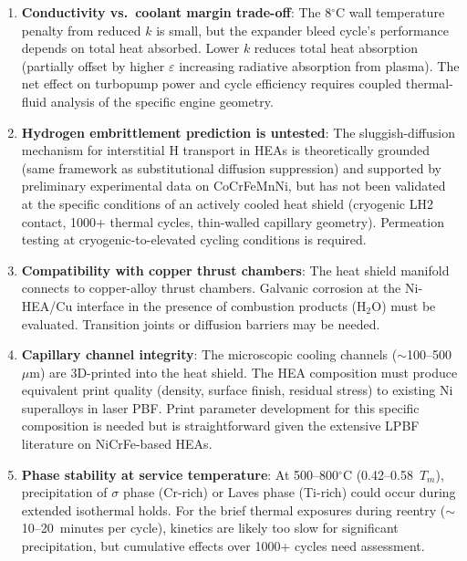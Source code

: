 \documentclass[12pt,letterpaper]{article}
\theoremstyle{definition}
\begin{document}
\begin{enumerate}
  \item \textbf{Conductivity vs.\ coolant margin trade-off}: The 8$^\circ$C wall temperature penalty from reduced $k$ is small, but the expander bleed cycle's performance depends on total heat absorbed.  Lower $k$ reduces total heat absorption (partially offset by higher $\varepsilon$ increasing radiative absorption from plasma).  The net effect on turbopump power and cycle efficiency requires coupled thermal-fluid analysis of the specific engine geometry.

  \item \textbf{Hydrogen embrittlement prediction is untested}: The sluggish-diffusion mechanism for interstitial H transport in HEAs is theoretically grounded (same framework as substitutional diffusion suppression) and supported by preliminary experimental data on CoCrFeMnNi, but has not been validated at the specific conditions of an actively cooled heat shield (cryogenic LH2 contact, 1000+ thermal cycles, thin-walled capillary geometry).  Permeation testing at cryogenic-to-elevated cycling conditions is required.

  \item \textbf{Compatibility with copper thrust chambers}: The heat shield manifold connects to copper-alloy thrust chambers.  Galvanic corrosion at the Ni-HEA/Cu interface in the presence of combustion products (H$_2$O) must be evaluated.  Transition joints or diffusion barriers may be needed.

  \item \textbf{Capillary channel integrity}: The microscopic cooling channels ($\sim$100--500~$\mu$m) are 3D-printed into the heat shield.  The HEA composition must produce equivalent print quality (density, surface finish, residual stress) to existing Ni superalloys in laser PBF\@.  Print parameter development for this specific composition is needed but is straightforward given the extensive LPBF literature on NiCrFe-based HEAs.

  \item \textbf{Phase stability at service temperature}: At 500--800$^\circ$C (0.42--0.58~$T_m$), precipitation of $\sigma$ phase (Cr-rich) or Laves phase (Ti-rich) could occur during extended isothermal holds.  For the brief thermal exposures during reentry ($\sim$10--20~minutes per cycle), kinetics are likely too slow for significant precipitation, but cumulative effects over 1000+ cycles need assessment.
\end{enumerate}
\end{document}
